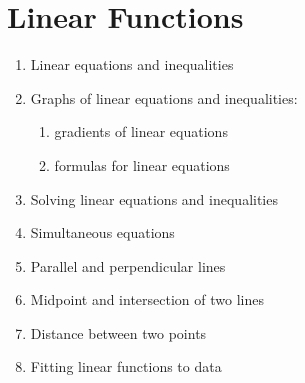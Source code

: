 
\chapter{Linear Functions}

\begin{enumerate}
\item Linear equations and inequalities

\item Graphs of linear equations and inequalities:
  \begin{enumerate}
  \item gradients of linear equations

  \item formulas for linear equations
  \end{enumerate}

\item Solving linear equations and inequalities

\item Simultaneous equations

\item Parallel and perpendicular lines

\item Midpoint and intersection of two lines

\item Distance between two points

\item Fitting linear functions to data
\end{enumerate}
